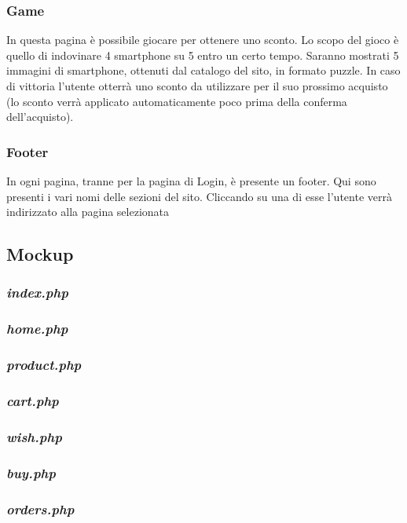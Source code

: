 \documentclass[12pt]{extarticle}
\begin{document}
\subsubsection{Game}
In questa pagina è possibile giocare per ottenere uno sconto. Lo scopo del gioco è quello di
indovinare 4 smartphone su 5 entro un certo tempo. Saranno mostrati 5 immagini di smartphone,
ottenuti dal catalogo del sito, in formato puzzle. In caso di vittoria l'utente otterrà uno sconto da 
utilizzare per il suo prossimo acquisto (lo sconto verrà applicato automaticamente poco prima
della conferma dell'acquisto).


\subsubsection{Footer}
In ogni pagina, tranne per la pagina di Login, è presente un footer. Qui sono presenti i vari nomi
delle sezioni del sito. Cliccando su una di esse l'utente verrà indirizzato alla pagina selezionata

\subsection{Mockup}

\subsubsection{\textit{index.php}}
\subsubsection{\textit{home.php}}
\subsubsection{\textit{product.php}}
\subsubsection{\textit{cart.php}}
\subsubsection{\textit{wish.php}}
\subsubsection{\textit{buy.php}}
\subsubsection{\textit{orders.php}}
\end{document}
